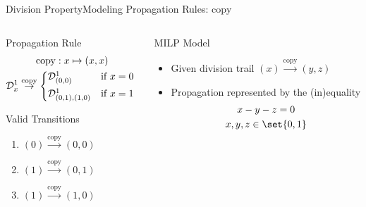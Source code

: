 \begin{frame}{Division Property}{Modeling Propagation Rules: $\mathrm{copy}$}
    \begin{columns}
        \begin{column}{0.35\textwidth}
            \begin{block}{Propagation Rule}
                \vspace*{-15pt}
                \begin{gather*}
                    \mathrm{copy} : x \mapsto (x, x) \\
                    \mathcal{D}^1_x \stackrel{\mathrm{copy}}{\to} \begin{cases*}
                        \mathcal{D}^1_{(0,0)}       & if $x = 0$ \\
                        \mathcal{D}^1_{(0,1),(1,0)} & if $x = 1$
                    \end{cases*}
                \end{gather*}
                \vspace*{-3pt}
            \end{block}
            \begin{block}{Valid Transitions}
                \begin{enumerate}
                    \item \quad $(0) \stackrel{\mathrm{copy}}{\to} (0, 0)$
                    \item \quad $(1) \stackrel{\mathrm{copy}}{\to} (0, 1)$
                    \item \quad $(1) \stackrel{\mathrm{copy}}{\to} (1, 0)$
                \end{enumerate}
            \end{block}
            \pause
        \end{column}
        \begin{column}{0.575\textwidth}
            \begin{block}{MILP Model}
                \begin{itemize}
                    \item Given division trail $(x) \stackrel{\mathrm{copy}}{\to} (y, z)$\\[2pt]
                    \item Propagation represented by the (in)equality
                        \begin{gather*}
                            x - y - z = 0\\
                            x, y, z \in \set{0,1}
                        \end{gather*}
                \end{itemize}
            \end{block}
        \end{column}
    \end{columns}
\end{frame}

